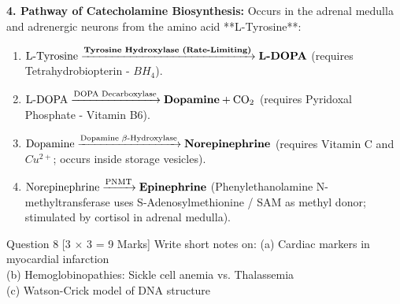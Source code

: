 \documentclass[11pt,a4paper]{article}
\begin{document}
\begin{ansbox}
\textbf{4. Pathway of Catecholamine Biosynthesis:}
Occurs in the adrenal medulla and adrenergic neurons from the amino acid **L-Tyrosine**:
\begin{enumerate}[leftmargin=*]
    \item $\text{L-Tyrosine} \xrightarrow{\text{\textbf{Tyrosine Hydroxylase (Rate-Limiting)}}} \text{\textbf{L-DOPA}}$ (requires Tetrahydrobiopterin - $BH_4$).
    \item $\text{L-DOPA} \xrightarrow{\text{DOPA Decarboxylase}} \text{\textbf{Dopamine}} + \text{CO}_2$ (requires Pyridoxal Phosphate - Vitamin B6).
    \item $\text{Dopamine} \xrightarrow{\text{Dopamine $\beta$-Hydroxylase}} \text{\textbf{Norepinephrine}}$ (requires Vitamin C and $Cu^{2+}$; occurs inside storage vesicles).
    \item $\text{Norepinephrine} \xrightarrow{\text{PNMT}} \text{\textbf{Epinephrine}}$ (Phenylethanolamine N-methyltransferase uses S-Adenosylmethionine / SAM as methyl donor; stimulated by cortisol in adrenal medulla).
\end{enumerate}
\end{ansbox}

\begin{qbox}{Question 8 [3 $\times$ 3 = 9 Marks]}
Write short notes on:
(a) Cardiac markers in myocardial infarction \\
(b) Hemoglobinopathies: Sickle cell anemia vs. Thalassemia \\
(c) Watson-Crick model of DNA structure
\end{qbox}
\end{document}
